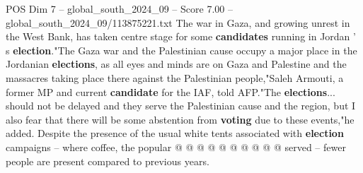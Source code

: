 \begin{textsample}{POS Dim 7 – global\_south\_2024\_09 – Score 7.00 – global\_south\_2024\_09/113875221.txt}
The war in Gaza, and growing unrest in the West Bank, has taken centre stage for some \textbf{candidates} running in Jordan ' s \textbf{election}."The Gaza war and the Palestinian cause occupy a major place in the Jordanian \textbf{elections}, as all eyes and minds are on Gaza and Palestine and the massacres taking place there against the Palestinian people,"Saleh Armouti, a former MP and current \textbf{candidate} for the IAF, told AFP."The \textbf{elections}... should not be delayed and they serve the Palestinian cause and the region, but I also fear that there will be some abstention from \textbf{voting} due to these events,"he added.
Despite the presence of the usual white tents associated with \textbf{election} campaigns -- where coffee, the popular @ @ @ @ @ @ @ @ @ @ served -- fewer people are present compared to previous years.

\end{textsample}

